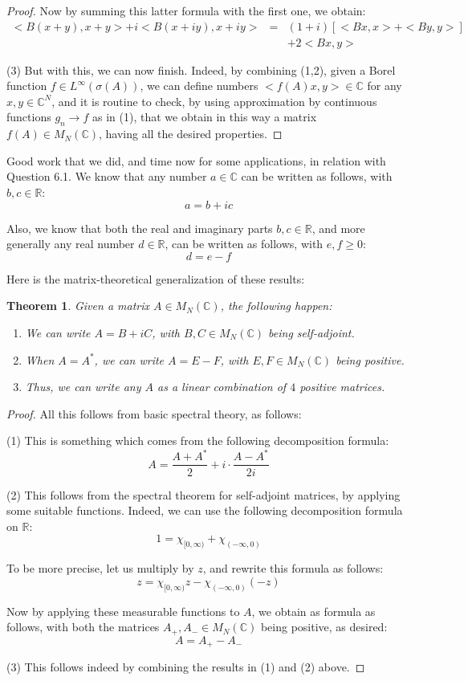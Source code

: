 \documentclass[12pt]{amsbook}
\newtheorem{theorem}{Theorem}[chapter]
\begin{document}
\begin{proof}
Now by summing this latter formula with the first one, we obtain:
\begin{eqnarray*}
<B(x+y),x+y>+i<B(x+iy),x+iy>
&=&(1+i)[<Bx,x>+<By,y>]\\
&&+2<Bx,y>
\end{eqnarray*}

(3) But with this, we can now finish. Indeed, by combining (1,2), given a Borel function $f\in L^\infty(\sigma(A))$, we can define numbers $<f(A)x,y>\in\mathbb C$ for any $x,y\in\mathbb C^N$, and it is routine to check, by using approximation by continuous functions $g_n\to f$ as in (1), that we obtain in this way a matrix $f(A)\in M_N(\mathbb C)$, having all the desired properties.
\end{proof}

Good work that we did, and time now for some applications, in relation with Question 6.1. We know that any number $a\in\mathbb C$ can be written as follows, with $b,c\in\mathbb R$:
$$a=b+ic$$

Also, we know that both the real and imaginary parts $b,c\in\mathbb R$, and more generally any real number $d\in\mathbb R$, can be written as follows, with $e,f\geq0$: 
$$d=e-f$$

Here is the matrix-theoretical generalization of these results:

\begin{theorem}
Given a matrix $A\in M_N(\mathbb C)$, the following happen:
\begin{enumerate}
\item We can write $A=B+iC$, with $B,C\in M_N(\mathbb C)$ being self-adjoint.

\item When $A=A^*$, we can write $A=E-F$, with $E,F\in M_N(\mathbb C)$ being positive.

\item Thus, we can write any $A$ as a linear combination of $4$ positive matrices.
\end{enumerate}
\end{theorem}

\begin{proof}
All this follows from basic spectral theory, as follows:

\medskip

(1) This is something which comes from the following decomposition formula:
$$A=\frac{A+A^*}{2}+i\cdot\frac{A-A^*}{2i}$$

(2) This follows from the spectral theorem for self-adjoint matrices, by applying some suitable functions. Indeed, we can use the following decomposition formula on $\mathbb R$:
$$1=\chi_{[0,\infty)}+\chi_{(-\infty,0)}$$

To be more precise, let us multiply by $z$, and rewrite this formula as follows:
$$z=\chi_{[0,\infty)}z-\chi_{(-\infty,0)}(-z)$$

Now by applying these measurable functions to $A$, we obtain as formula as follows, with both the matrices $A_+,A_-\in M_N(\mathbb C)$ being positive, as desired:
$$A=A_+-A_-$$

(3) This follows indeed by combining the results in (1) and (2) above.
\end{proof}
\end{document}
